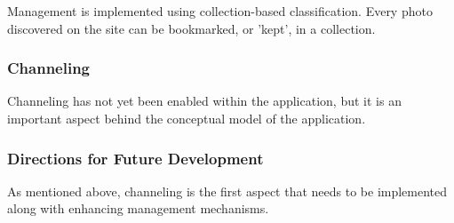 {{{Management is implemented using collection-based classification.
Every photo discovered on the site can be bookmarked, or 'kept', in a collection.
}
{\subsubsection{Channeling}
Channeling has not yet been enabled within the application, but it is an important aspect behind the conceptual model of the application.
}
{\subsubsection{Directions for Future Development}
As mentioned above, channeling is the first aspect that needs to be implemented along with enhancing management mechanisms.
}
} %
} %



